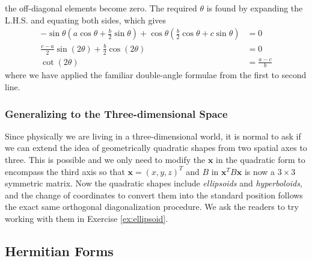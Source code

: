 the off-diagonal elements become zero. The required $\theta$ is found by expanding the L.H.S. and equating both sides, which gives
\begin{align}
-\sin \theta (a \cos\theta + \frac{b}{2}\sin \theta) + \cos\theta (\frac{b}{2} \cos \theta + c\sin \theta) &= 0 \nonumber \\
\frac{c-a}{2} \sin (2\theta) + \frac{b}{2}\cos(2\theta) &= 0 \nonumber \\
\cot(2\theta) &= \frac{a-c}{b} \label{eqn:rotate2dquad}
\end{align}
where we have applied the familiar double-angle formulae from the first to second line.

\subsubsection{Generalizing to the Three-dimensional Space}
Since physically we are living in a three-dimensional world, it is normal to ask if we can extend the idea of geometrically quadratic shapes from two spatial axes to three. This is possible and we only need to modify the $\textbf{x}$ in the quadratic form to encompass the third axis so that $\textbf{x} = (x,y,z)^T$ and $B$ in $\textbf{x}^TB\textbf{x}$ is now a $3 \times 3$ symmetric matrix. Now the quadratic shapes include \textit{ellipsoids} and \textit{hyperboloids}, and the change of coordinates to convert them into the standard position follows the exact same orthogonal diagonalization procedure. We ask the readers to try working with them in Exercise \ref{ex:ellipsoid}.

\subsection{Hermitian Forms}
\label{section:hermform}

